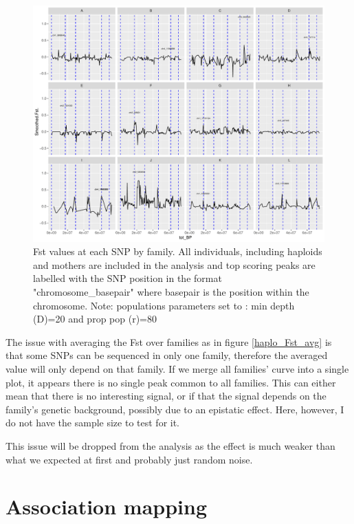 \documentclass[10pt,a4paper]{report}
\begin{document}
\begin{figure}[h]
	\begin{center}
		\includegraphics[width=\textwidth]{M-F_Fst/haplo_Fst_per_fam.pdf}
		\caption{Fst values at each SNP by family. All individuals, including haploids and mothers are included in the analysis and top scoring peaks are labelled with the SNP position in the format "chromosome\_basepair" where basepair is the position within the chromosome. Note: populations parameters set to : min depth (D)=20 and prop pop (r)=80}
		\label{haplo_Fst_per_fam}
	\end{center}
\end{figure}
\FloatBarrier

The issue with averaging the Fst over families as in figure \ref{haplo_Fst_avg} is that some SNPs can be sequenced in only one family, therefore the averaged value will only depend on that family. If we merge all families' curve into a single plot, it appears there is no single peak common to all families. 
This can either mean that there is no interesting signal, or if that the signal depends on the family's genetic background, possibly due to an epistatic effect. Here, however, I do not have the sample size to test for it. 

This issue will be dropped from the analysis as the effect is much weaker than what we expected at first and probably just random noise.

\chapter{Association mapping}
\end{document}
